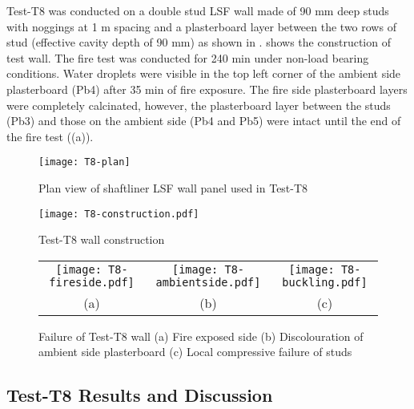 Test-T8 was conducted on a double stud LSF wall made of 90 mm deep studs with noggings at 1 m spacing and a plasterboard layer between the two rows of stud (effective cavity depth of 90 mm) as shown in .  shows the construction of test wall. The fire test was conducted for 240 min under non-load bearing conditions. Water droplets were visible in the top left corner of the ambient side plasterboard (Pb4) after 35 min of fire exposure. The fire side plasterboard layers were completely calcinated, however, the plasterboard layer between the studs (Pb3) and those on the ambient side (Pb4 and Pb5) were intact until the end of the fire test ((a)). 
\begin{figure}[!htbp]
	\centering
		\texttt{[image: T8-plan]}
		\caption{Plan view of shaftliner LSF wall panel used in Test-T8}
		\label{fig:T8-plan}
\end{figure}
\begin{figure}[htbp]
	\centering
	\texttt{[image: T8-construction.pdf]}
	\caption{Test-T8 wall construction}
	\label{fig:T8-construction}
\end{figure}
\begin{figure}[!htbp]
	\centering	
		\begin{tabular}{ccc}
			\texttt{[image: T8-fireside.pdf]} & 
			\texttt{[image: T8-ambientside.pdf]} & 
			\texttt{[image: T8-buckling.pdf]} \\
			(a) & (b) & (c) \\
			\end{tabular}
		\caption{Failure of Test-T8 wall (a) Fire exposed side (b) Discolouration of ambient side plasterboard (c) Local compressive failure of studs}
		\label{fig:T8-failure}
\end{figure}

\subsection{Test-T8 Results and Discussion}

